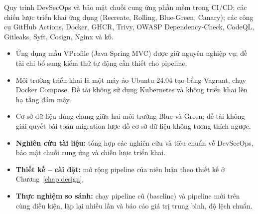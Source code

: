 \documentclass[12pt,a4paper,oneside]{extreport}
\begin{document}
Quy trình DevSecOps và bảo mật chuỗi cung ứng phần mềm trong CI/CD; các chiến
lược triển khai ứng dụng (Recreate, Rolling, Blue-Green, Canary); các công cụ
GitHub Actions, Docker, GHCR, Trivy, OWASP Dependency-Check, CodeQL, Gitleaks,
Syft, Cosign, Nginx và k6.

\begin{itemize}
  \item Ứng dụng mẫu VProfile (Java Spring MVC) được giữ nguyên nghiệp vụ; đề
  tài chỉ bổ sung kiểm thử tự động cần thiết cho pipeline.
  \item Môi trường triển khai là một máy ảo Ubuntu 24.04 tạo bằng Vagrant, chạy
  Docker Compose. Đề tài không sử dụng Kubernetes và không triển khai lên hạ
  tầng đám mây.
  \item Cơ sở dữ liệu dùng chung giữa hai môi trường Blue và Green; đề tài không
  giải quyết bài toán migration lược đồ cơ sở dữ liệu không tương thích ngược.
\end{itemize}

\begin{itemize}
  \item \textbf{Nghiên cứu tài liệu:} tổng hợp các nghiên cứu và tiêu chuẩn về
  DevSecOps, bảo mật chuỗi cung ứng và chiến lược triển khai.
  \item \textbf{Thiết kế -- cài đặt:} mở rộng pipeline của niên luận theo thiết
  kế ở Chương~\ref{chap:design}.
  \item \textbf{Thực nghiệm so sánh:} chạy pipeline cũ (baseline) và pipeline mới
  trên cùng điều kiện, lặp lại nhiều lần và báo cáo giá trị trung bình, độ lệch
  chuẩn.
\end{itemize}
\end{document}
